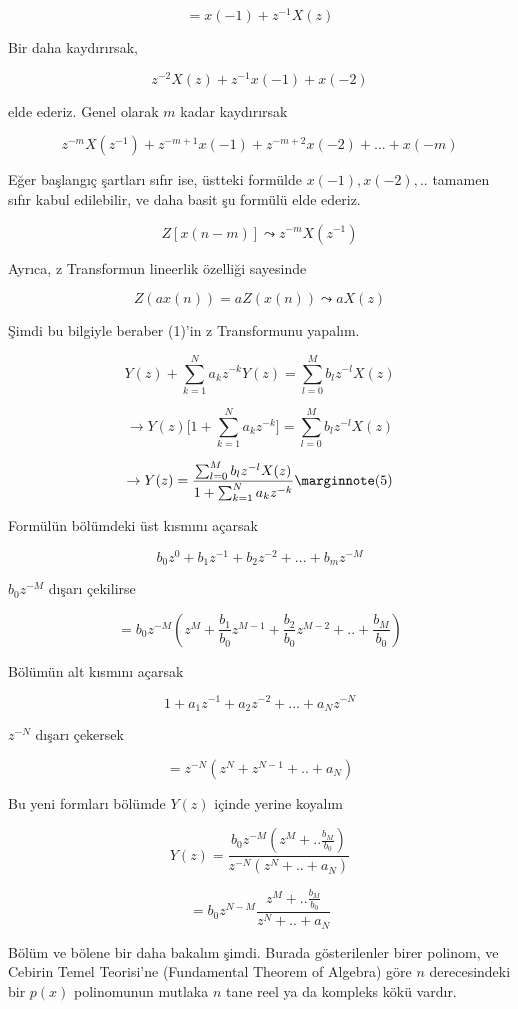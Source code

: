 \documentclass[12pt,fleqn]{article}\usepackage{../../common}
\begin{document}
$$ = x(-1) + z^{-1}X(z)$$

Bir daha kaydırırsak, 

$$ z^{-2}X(z) + z^{-1}x(-1) + x(-2) $$

elde ederiz. Genel olarak $m$ kadar kaydırırsak

$$ z^{-m}X(z^{-1}) + z^{-m+1}x(-1) + z^{-m+2}x(-2) + ... + x(-m) $$

Eğer başlangıç şartları sıfır ise, üstteki formülde $x(-1),x(-2),..$
tamamen sıfır kabul edilebilir, ve daha basit şu formülü elde ederiz. 

$$ Z[x(n-m)] \leadsto z^{-m}X(z^{-1})$$

Ayrıca, z Transformun lineerlik özelliği sayesinde 

$$ Z(ax(n)) = aZ(x(n)) \leadsto aX(z) $$

Şimdi bu bilgiyle beraber (1)'in z Transformunu yapalım. 

$$ Y(z) + \sum_{k=1}^Na_kz^{-k}Y(z) = \sum_{l=0}^M b_l z^{-l}X(z)  $$

$$ \to Y(z) \bigg[ 1 + \sum_{k=1}^Na_kz^{-k} \bigg] = \sum_{l=0}^M b_l z^{-l}X(z)  $$

$$ \to Y(z)  = \frac{\sum_{l=0}^M b_l z^{-l}X(z) }{ 1 +
  \sum_{k=1}^Na_kz^{-k}} 
\mlabel{5}
$$

Formülün bölümdeki üst kısmını açarsak 

$$ b_0z^0 + b_1z^{-1} + b_2z^{-2} + ... + b_mz^{-M} $$

$b_0z^{-M}$ dışarı çekilirse

$$ = b_0z^{-M}(z^M + \frac{b_1}{b_0}z^{M-1} +  \frac{b_2}{b_0}z^{M-2} +
.. + 
 \frac{b_M}{b_0})
$$

Bölümün alt kısmını açarsak 

$$ 1 + a_1z^{-1} + a_2z^{-2} + ... + a_Nz^{-N} $$

$z^{-N}$ dışarı çekersek 

$$ = z^{-N} ( z^{N} + z^{N-1} + .. + a_N) $$

Bu yeni formları bölümde $Y(z)$ içinde yerine koyalım

$$ Y(z) = 
\frac{b_0z^{-M}(z^M + ..\frac{b_M}{b_0})}{z^{-N} ( z^{N} + .. + a_N)} 
$$

$$ = b_0 z^{N - M} \frac{z^M + ..\frac{b_M}{b_0}}{z^{N} + .. + a_N }$$

Bölüm ve bölene bir daha bakalım şimdi. Burada gösterilenler birer polinom,
ve Cebirin Temel Teorisi'ne (Fundamental Theorem of Algebra) göre $n$
derecesindeki bir $p(x)$ polinomunun mutlaka $n$ tane reel ya da kompleks
kökü vardır. 
\end{document}
